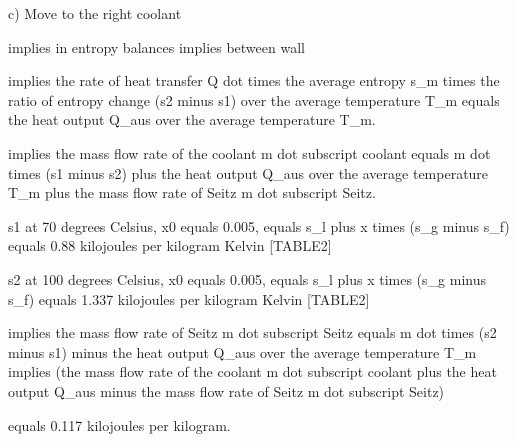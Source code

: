c) Move to the right coolant

implies in entropy balances implies between wall

implies the rate of heat transfer Q dot times the average entropy s_m times the ratio of entropy change (s2 minus s1) over the average temperature T_m equals the heat output Q_aus over the average temperature T_m.

implies the mass flow rate of the coolant m dot subscript coolant equals m dot times (s1 minus s2) plus the heat output Q_aus over the average temperature T_m plus the mass flow rate of Seitz m dot subscript Seitz.

s1 at 70 degrees Celsius, x0 equals 0.005, equals s_l plus x times (s_g minus s_f) equals 0.88 kilojoules per kilogram Kelvin [TABLE2]

s2 at 100 degrees Celsius, x0 equals 0.005, equals s_l plus x times (s_g minus s_f) equals 1.337 kilojoules per kilogram Kelvin [TABLE2]

implies the mass flow rate of Seitz m dot subscript Seitz equals m dot times (s2 minus s1) minus the heat output Q_aus over the average temperature T_m implies (the mass flow rate of the coolant m dot subscript coolant plus the heat output Q_aus minus the mass flow rate of Seitz m dot subscript Seitz)

equals 0.117 kilojoules per kilogram.
